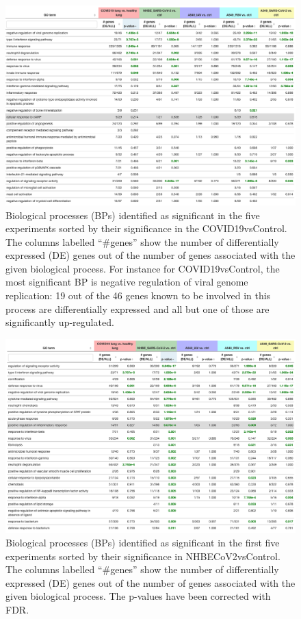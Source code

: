 \begin{figure}
\centering
	 \includegraphics[width=1\linewidth]{../Figures/BPs_elim_FDR_all.png}
    \caption{Biological processes (BPs) identified as significant in the five experiments sorted by their significance in the COVID19vsControl. The  columns labelled ``\#genes'' show the number of differentially expressed (DE) genes out of the number of genes associated with the given biological process.  For instance for COVID19vsControl, the most significant BP is negative regulation of viral genome replication: 19 out of the 46 genes known to be involved in this process are differentially expressed and all but one of those are significantly up-regulated.  \label{Supp:BPs}}
        
\end{figure}

\begin{figure}
\centering
	\includegraphics[width=1\linewidth]{../Figures/BPs_elim_FDR_all_orderedby_NHBE.png}
    \caption{Biological processes (BPs) identified as significant in the first five experiments sorted by their significance in NHBECoV2vsControl. The  columns labelled ``\#genes'' show the number of differentially expressed (DE) genes out of the number of genes associated with the given biological process. The p-values have been corrected with FDR. }
        \label{Supp:BP_orderedby_NHBE} 
\end{figure}



